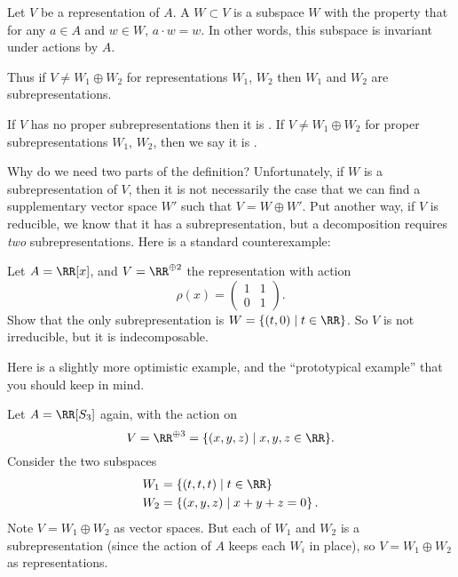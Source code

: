 \documentclass[11pt]{scrreprt}
\begin{document}
\begin{definition}
	Let $V$ be a representation of $A$.
	A  $W \subset V$ is a subspace $W$
	with the property that for any $a \in A$ and $w \in W$,
	$a \cdot w = w$.
	In other words, this subspace is invariant under actions by $A$.
\end{definition}
Thus if $V \neq W_1 \oplus W_2$ for representations $W_1$, $W_2$
then $W_1$ and $W_2$ are subrepresentations.

\begin{definition}
	If $V$ has no proper subrepresentations then it is .
	If $V \neq W_1 \oplus W_2$ for proper subrepresentations $W_1$, $W_2$,
	then we say it is .
\end{definition}

Why do we need two parts of the definition?
Unfortunately, if $W$ is a subrepresentation of $V$,
then it is not necessarily the case that we can find a
supplementary vector space $W'$ such that $V = W \oplus W'$.
Put another way, if $V$ is reducible, we know that it has a subrepresentation,
but a decomposition requires \emph{two} subrepresentations.
Here is a standard counterexample:
\begin{exercise}
	Let $A = \RR[x]$, and $V = \RR^{\oplus 2}$ the representation with action
	\[ \rho(x) = \begin{pmatrix} 1 & 1 \\ 0 & 1 \end{pmatrix}. \]
	Show that the only subrepresentation is $W = \{ (t,0) \mid t \in \RR \}$.
	So $V$ is not irreducible, but it is indecomposable.
\end{exercise}

Here is a slightly more optimistic example,
and the ``prototypical example'' that you should keep in mind.
\begin{example}
	Let $A = \RR[S_3]$ again,
	with the action on 
	\[ V = \RR^{\oplus 3} = \{ (x,y,z) \mid x,y,z \in \RR \}. \]
	Consider the two subspaces
	\begin{align*}
		W_1 &= \left\{ (t,t,t) \mid t \in \RR \right\} \\
		W_2 &= \left\{ (x,y,z) \mid x+y+z = 0 \right\}.
	\end{align*}
	Note $V = W_1 \oplus W_2$ as vector spaces.
	But each of $W_1$ and $W_2$ is a subrepresentation
	(since the action of $A$ keeps each $W_i$ in place),
	so $V = W_1 \oplus W_2$ as representations.
\end{example}
\end{document}
